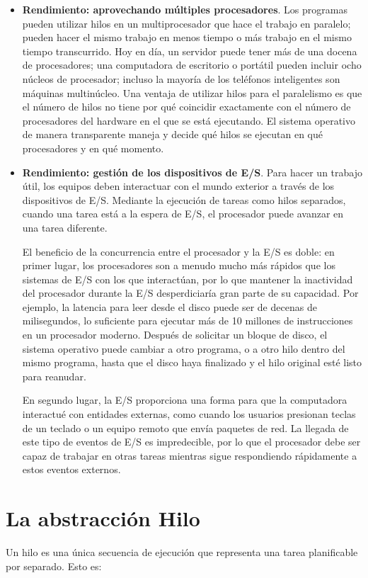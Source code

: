 \documentclass[10pt]{book}
\begin{document}
\begin{itemize}
\item \textbf{Rendimiento: aprovechando múltiples procesadores}. Los programas pueden utilizar hilos en un multiprocesador que hace el trabajo en paralelo; pueden hacer el mismo trabajo en menos tiempo o más trabajo en el mismo tiempo transcurrido. Hoy en día, un servidor puede tener más de una docena de procesadores; una computadora de escritorio o portátil pueden incluir ocho núcleos de procesador; incluso la mayoría de los teléfonos inteligentes son máquinas multinúcleo. Una ventaja de utilizar hilos para el paralelismo es que el número de hilos no tiene por qué coincidir exactamente con el número de procesadores del hardware en el que se está ejecutando. El sistema operativo de manera transparente maneja y decide qué hilos se ejecutan en qué procesadores y en qué momento.

\item \textbf{Rendimiento: gestión de los dispositivos de E/S}. Para hacer un trabajo útil, los equipos deben interactuar con el mundo exterior a través de los dispositivos de E/S. Mediante la ejecución de tareas como hilos separados, cuando una tarea está a la espera de E/S, el procesador puede avanzar en una tarea diferente.

El beneficio de la concurrencia entre el procesador y la E/S es doble: en primer lugar, los procesadores son a menudo mucho más rápidos que los sistemas de E/S con los que interactúan, por lo que mantener la inactividad del procesador durante la E/S desperdiciaría gran parte de su capacidad. Por ejemplo, la latencia para leer desde el disco puede ser de decenas de milisegundos, lo suficiente para ejecutar más de 10 millones de instrucciones en un procesador moderno. Después de solicitar un bloque de disco, el sistema operativo puede cambiar a otro programa, o a otro hilo dentro del mismo programa, hasta que el disco haya finalizado y el hilo original esté listo para reanudar.

En segundo lugar, la E/S proporciona una forma para que la computadora interactué con entidades externas, como cuando los usuarios presionan teclas de un teclado o un equipo remoto que envía paquetes de red. La llegada de este tipo de eventos de E/S es impredecible, por lo que el procesador debe ser capaz de trabajar en otras tareas mientras sigue respondiendo rápidamente a estos eventos externos.
\end{itemize}

\section{La abstracción Hilo}
Un hilo es una única secuencia de ejecución que representa una tarea planificable por separado. Esto es:
\end{document}
